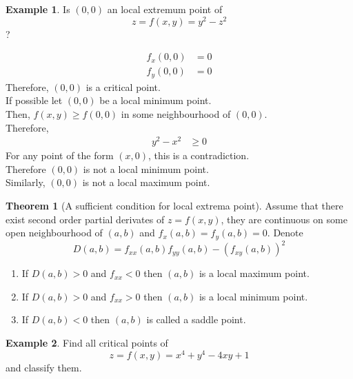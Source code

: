 \documentclass[fleqn, a4paper, 12pt, twoside]{article}
\theoremstyle{definition}
\newtheorem{example}{Example}
\theoremstyle{theorem}
\newtheorem{theorem}{Theorem}
\begin{document}
{\begin{example}
	Is $(0,0)$ an local extremum point of
	\begin{equation*}
		z = f(x, y) = y^2 - z^2
	\end{equation*}
	?
\end{example}
\begin{solution}
	\begin{align*}
		f_x(0,0) & = 0 \\
		f_y(0,0) & = 0
	\end{align*}
	Therefore, $(0,0)$ is a critical point.\\
	If possible let $(0,0)$ be a local minimum point.\\
	Then, $f(x,y) \geq f(0,0)$ in some neighbourhood of $(0,0)$.\\
	Therefore,
	\begin{align*}
		y^2 - x^2 & \geq 0
	\end{align*}
	For any point of the form $(x, 0)$, this is a contradiction.\\
	Therefore $(0,0)$ is not a local minimum point.\\
	Similarly, $(0,0)$ is not a local maximum point.
\end{solution}

\begin{theorem}[A sufficient condition for local extrema point]
	Assume that there exist second order partial derivates of $z = f(x,y)$, they are continuous on some open neighbourhood of $(a,b)$ and $f_x(a,b) =f_y(a,b) = 0$. Denote 
	\begin{equation*}
		D(a, b) = f_{xx}(a,b) f_{yy}(a,b) - \left( f_{xy}(a,b) \right)^2
	\end{equation*}
	\begin{enumerate}
		\item If $D(a,b) > 0$ and $f_{xx} < 0$ then $(a,b)$ is a local maximum point.
		\item If $D(a,b) > 0$ and $f_{xx} > 0$ then $(a,b)$ is a local minimum point.
		\item If $D(a,b) < 0$ then $(a,b)$ is called a saddle point.
	\end{enumerate}
\end{theorem}

\begin{example}
	Find all critical points of 
	\begin{equation*}
		z = f(x,y) = x^4 + y^4 - 4xy + 1
	\end{equation*}
	and classify them.
\end{example}

}
\end{document}

